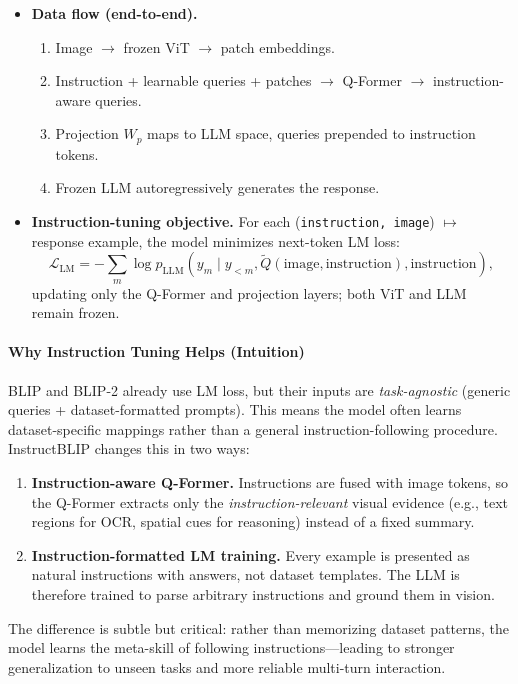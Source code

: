 \begin{enrichment}
\begin{enrichment}
\begin{itemize}
            \item \textbf{Data flow (end-to-end).}
            \begin{enumerate}
                \item Image $\rightarrow$ frozen ViT $\rightarrow$ patch embeddings.
                \item Instruction + learnable queries + patches $\rightarrow$ Q-Former $\rightarrow$ instruction-aware queries.
                \item Projection $W_p$ maps to LLM space, queries prepended to instruction tokens.
                \item Frozen LLM autoregressively generates the response.
            \end{enumerate}
            
            \item \textbf{Instruction-tuning objective.}
            For each (\texttt{instruction, image}) $\mapsto$ response example, the model minimizes next-token LM loss:
            \[
            \mathcal{L}_{\text{LM}} = - \sum_m \log p_{\text{LLM}}(y_m \mid y_{<m}, \tilde{Q}(\text{image}, \text{instruction}), \text{instruction}),
            \]
            updating only the Q-Former and projection layers; both ViT and LLM remain frozen.
        \end{itemize}
        
        \paragraph{Why Instruction Tuning Helps (Intuition)}
        BLIP and BLIP-2 already use LM loss, but their inputs are \emph{task-agnostic} (generic queries + dataset-formatted prompts). This means the model often learns dataset-specific mappings rather than a general instruction-following procedure. InstructBLIP changes this in two ways:
        \begin{enumerate}
            \item \textbf{Instruction-aware Q-Former.} Instructions are fused with image tokens, so the Q-Former extracts only the \emph{instruction-relevant} visual evidence (e.g., text regions for OCR, spatial cues for reasoning) instead of a fixed summary.
            \item \textbf{Instruction-formatted LM training.} Every example is presented as natural instructions with answers, not dataset templates. The LLM is therefore trained to parse arbitrary instructions and ground them in vision.
        \end{enumerate}
        The difference is subtle but critical: rather than memorizing dataset patterns, the model learns the meta-skill of following instructions—leading to stronger generalization to unseen tasks and more reliable multi-turn interaction.
        

\end{enrichment}
\end{enrichment}
